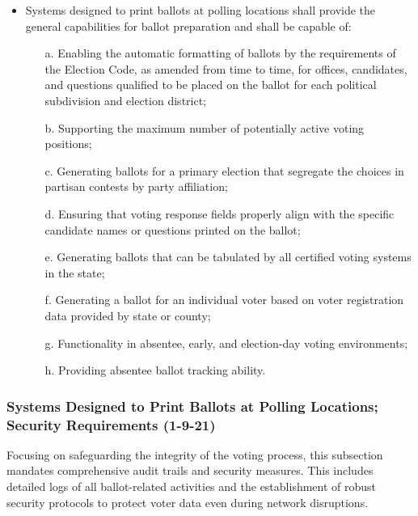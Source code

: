 \documentclass{article}
\begin{document}
\begin{itemize}
    \item Systems designed to print ballots at polling locations shall provide the general capabilities for ballot preparation and shall be capable of:
    \begin{itemize}
        \item[a.] Enabling the automatic formatting of ballots by the requirements of the Election Code, as amended from time to time, for offices, candidates, and questions qualified to be placed on the ballot for each political subdivision and election district;
        \item[b.] Supporting the maximum number of potentially active voting positions;
        \item[c.] Generating ballots for a primary election that segregate the choices in partisan contests by party affiliation;
        \item[d.] Ensuring that voting response fields properly align with the specific candidate names or questions printed on the ballot;
        \item[e.] Generating ballots that can be tabulated by all certified voting systems in the state;
        \item[f.] Generating a ballot for an individual voter based on voter registration data provided by state or county;
        \item[g.] Functionality in absentee, early, and election-day voting environments;
        \item[h.] Providing absentee ballot tracking ability.
    \end{itemize}
\end{itemize}

\subsubsection{Systems Designed to Print Ballots at Polling Locations; Security Requirements (1-9-21)}
Focusing on safeguarding the integrity of the voting process, this subsection mandates comprehensive audit trails and security measures. This includes detailed logs of all ballot-related activities and the establishment of robust security protocols to protect voter data even during network disruptions.
\end{document}
